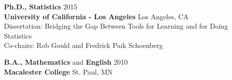 {\bf Ph.D., Statistics} \hfill 2015\\ 
{\bf University of California - Los Angeles} \hfill Los Angeles, CA \\
{Dissertation: Bridging the Gap Between Tools for Learning and for Doing Statistics} \\
{Co-chairs: Rob Gould and Fredrick Paik Schoenberg} \smallskip 

{\bf B.A., Mathematics} and {\bf English}  \hfill  2010 \\
{\bf Macalester College} \hfill St. Paul, MN\smallskip 




%
%


